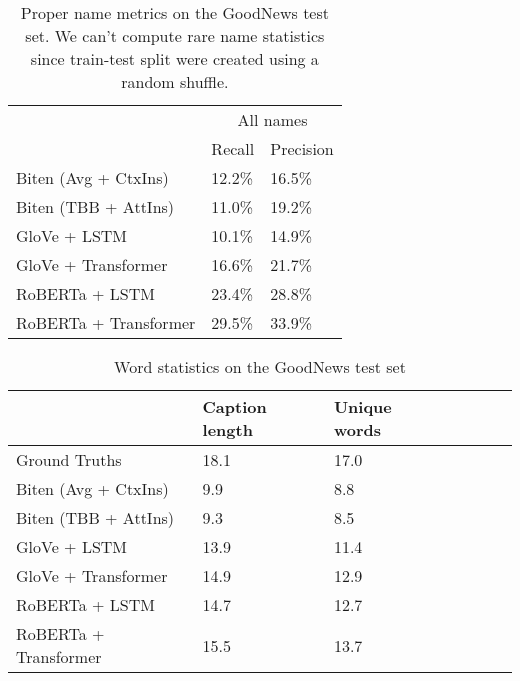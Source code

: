\documentclass[10pt,twocolumn,letterpaper]{article}
\begin{document}
\begin{table*}[t]
   \caption {Proper name metrics on the GoodNews test set. We can't compute rare name statistics
   since train-test split were created using a random shuffle.}
	\label{tab:results-names}
	\centering
	\begin{tabular}{lll}
		\toprule
        & \multicolumn{2}{c}{All names}  \\
        & Recall  & Precision \\
      \midrule
      Biten (Avg + CtxIns) \cite{Biten2019GoodNews} & 12.2\% & 16.5\% \\
      Biten (TBB + AttIns) \cite{Biten2019GoodNews} & 11.0\% & 19.2\% \\
      \midrule
      GloVe + LSTM & 10.1\% & 14.9\%  \\
      GloVe + Transformer & 16.6\% & 21.7\% \\
      RoBERTa + LSTM & 23.4\% & 28.8\%  \\
      RoBERTa + Transformer & 29.5\% & 33.9\%  \\
		\bottomrule
	\end{tabular}
\end{table*}

\begin{table*}[t]
	\caption {Word statistics on the GoodNews test set}
	\label{tab:results-stats}
	\centering
	\begin{tabular}{lllllll}
		\toprule
        & Caption length  & Unique words \\
      \midrule
      Ground Truths & 18.1 & 17.0 \\
      \midrule
      Biten (Avg + CtxIns) \cite{Biten2019GoodNews}  & 9.9 & 8.8 \\
      Biten (TBB + AttIns) \cite{Biten2019GoodNews}  & 9.3 & 8.5 \\
      \midrule
      GloVe + LSTM & 13.9 & 11.4 \\
      GloVe + Transformer & 14.9 & 12.9 \\
      RoBERTa + LSTM & 14.7 & 12.7  \\
      RoBERTa + Transformer & 15.5 & 13.7 \\
		\bottomrule
	\end{tabular}
\end{table*}
\end{document}
